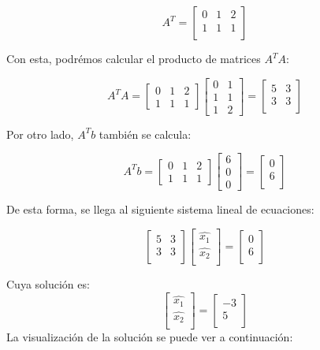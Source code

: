 {{{{$$A^T = \begin{bmatrix}
0 & 1 & 2\\
1 & 1 & 1 \\
\end{bmatrix}$$

Con esta, podrémos calcular el producto de matrices $A^TA$:

$$A^TA = \begin{bmatrix}
0 & 1 & 2\\
1 & 1 & 1
\end{bmatrix} \begin{bmatrix}
0 & 1 \\
1 & 1 \\
1 & 2
\end{bmatrix}  = \begin{bmatrix}
5 & 3 \\
3 & 3 \\
\end{bmatrix}$$

Por otro lado, $A^Tb$ también se calcula:

$$A^Tb = \begin{bmatrix}
0 & 1 & 2\\
1 & 1 & 1
\end{bmatrix}\begin{bmatrix} 6 \\ 0\\ 0 \end{bmatrix} =\begin{bmatrix} 0 \\ 6\\  \end{bmatrix} $$

De esta forma, se llega al siguiente sistema lineal de ecuaciones:

$$ \begin{bmatrix}
5 & 3 \\
3 & 3 \\
\end{bmatrix}\begin{bmatrix} \hat{x_1} \\ \hat{x_2}\\ \end{bmatrix} =\begin{bmatrix} 0 \\ 6\\  \end{bmatrix} $$

Cuya solución es: 
$$
\begin{bmatrix} \hat{x_1} \\ \hat{x_2}\\ \end{bmatrix} =\begin{bmatrix} -3 \\ 5\\  \end{bmatrix} $$
La visualización de la solución se puede ver a continuación:

}}}}
